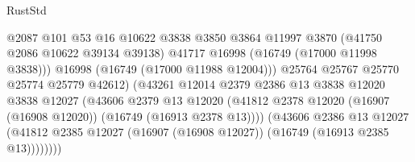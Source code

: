 \begin{lexlean}{RustStd}
\begin{coremodule}
                                              @2087
                                              @101
                                              @53
                                              @16
                                              @10622
                                              @3838
                                              @3850
                                              @3864
                                              @11997
                                              @3870
                                              (@41750 @2086 @10622 @39134 @39138)
                                              @41717
                                              @16998
                                              (@16749 (@17000 @11998 @3838)))
                                            @16998
                                            (@16749 (@17000 @11988 @12004)))
                                          @25764
                                          @25767
                                          @25770
                                          @25774
                                          @25779
                                          @42612)
                                        (@43261
                                          @12014
                                          @2379
                                          @2386
                                          @13
                                          @3838
                                          @12020
                                          @3838
                                          @12027
                                          (@43606
                                            @2379
                                            @13
                                            @12020
                                            (@41812
                                              @2378
                                              @12020
                                              (@16907 (@16908 @12020))
                                              (@16749 (@16913 @2378 @13))))
                                          (@43606
                                            @2386
                                            @13
                                            @12027
                                            (@41812
                                              @2385
                                              @12027
                                              (@16907 (@16908 @12027))
                                              (@16749 (@16913 @2385 @13))))))))

\end{coremodule}
\end{lexlean}
